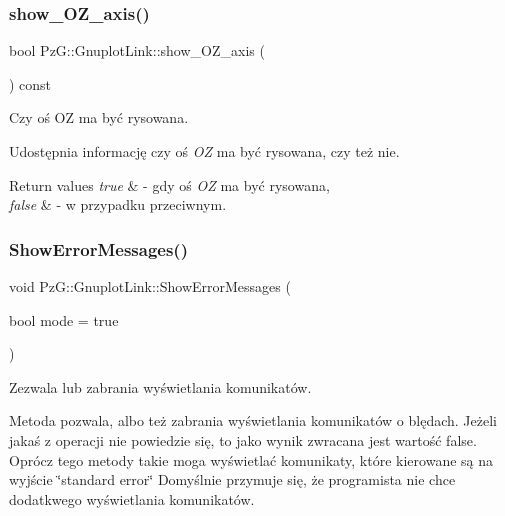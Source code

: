 \subsubsection{\texorpdfstring{show\+\_\+\+O\+Z\+\_\+axis()}{show\_OZ\_axis()}\hspace{0.1cm}{\footnotesize\ttfamily [2/2]}}
{\footnotesize\ttfamily bool Pz\+G\+::\+Gnuplot\+Link\+::show\+\_\+\+O\+Z\+\_\+axis (\begin{DoxyParamCaption}{ }\end{DoxyParamCaption}) const\hspace{0.3cm}{\ttfamily [inline]}}



Czy oś OZ ma być rysowana. 

Udostępnia informację czy oś {\itshape OZ} ma być rysowana, czy też nie. 
\begin{DoxyRetVals}{Return values}
{\em true} & -\/ gdy oś {\itshape OZ} ma być rysowana, \\
\hline
{\em false} & -\/ w przypadku przeciwnym. \\
\hline
\end{DoxyRetVals}
\mbox{\label{class_pz_g_1_1_gnuplot_link_a9c8f23498ce784bd4f62583163e9c065}} 
\subsubsection{\texorpdfstring{Show\+Error\+Messages()}{ShowErrorMessages()}}
{\footnotesize\ttfamily void Pz\+G\+::\+Gnuplot\+Link\+::\+Show\+Error\+Messages (\begin{DoxyParamCaption}\item[{bool}]{mode = {\ttfamily true} }\end{DoxyParamCaption})}



Zezwala lub zabrania wyświetlania komunikatów. 

Metoda pozwala, albo też zabrania wyświetlania komunikatów o blędach. Jeżeli jakaś z operacji nie powiedzie się, to jako wynik zwracana jest wartość {\ttfamily false}. Oprócz tego metody takie moga wyświetlać komunikaty, które kierowane są na wyjście \char`\"{}standard error\char`\"{} Domyślnie przymuje się, że programista nie chce dodatkwego wyświetlania komunikatów. \mbox{\label{class_pz_g_1_1_gnuplot_link_a4211e715251f1f90e56f5ec64c672d64}} 

